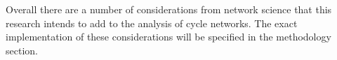\documentclass[11pt]{article} %
\begin{document}
Overall there are a number of considerations from network science that this research intends to add to the analysis of cycle networks. The exact implementation of these considerations will be specified in the methodology section. 

%
%
%
%
%
\end{document}
